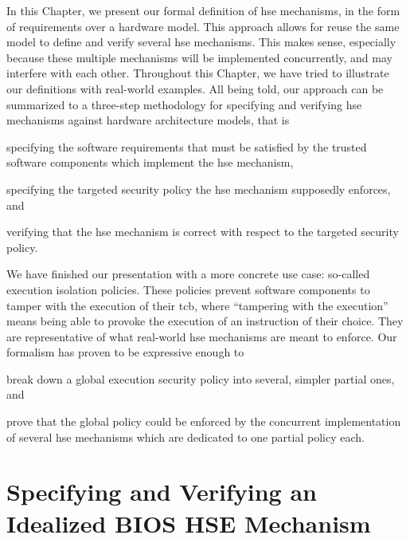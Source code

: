 In this Chapter, we present our formal definition of \ac{hse} mechanisms, in the
form of requirements over a hardware model.
%
This approach allows for reuse the same model to define and verify several
\ac{hse} mechanisms.
%
This makes sense, especially because these multiple mechanisms will be
implemented concurrently, and may interfere with each other.
%
Throughout this Chapter, we have tried to illustrate our definitions with
real-world examples.
%
All being told, our approach can be summarized to a three-step methodology for
specifying and verifying \ac{hse} mechanisms against hardware architecture
models, that is
%
\begin{inparaenum}[(1)]
\item specifying the software requirements that must be satisfied by the trusted
  software components which implement the \ac{hse} mechanism,
%
\item specifying the targeted security policy the \ac{hse} mechanism supposedly
  enforces, and
%
\item verifying that the \ac{hse} mechanism is correct with respect to the
  targeted security policy.
\end{inparaenum}

We have finished our presentation with a more concrete use case: so-called
execution isolation policies.
%
These policies prevent software components to tamper with the execution of their
\ac{tcb}, where ``tampering with the execution'' means being able to provoke the
execution of an instruction of their choice.
%
They are representative of what real-world \ac{hse} mechanisms are meant to
enforce.
%
Our formalism has proven to be expressive enough to
%
\begin{inparaenum}[(1)]
\item break down a global execution security policy into several, simpler
  partial ones, and
%
\item prove that the global policy could be enforced by the concurrent
  implementation of several \ac{hse} mechanisms which are dedicated to one
  partial policy each.
\end{inparaenum}

\chapter{Specifying and Verifying an Idealized BIOS HSE Mechanism}


